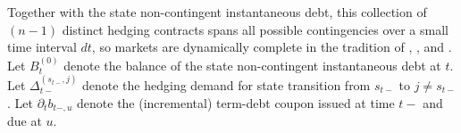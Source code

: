 \documentclass[12pt]{article}
\newcommand{\WJ}[1]{{\textcolor{red}{#1}}}
\begin{document}

Together with the state non-contingent instantaneous  debt, this  collection of  $(n-1)$ distinct hedging contracts  spans all possible contingencies over a small time interval $dt$, so  markets  are  dynamically complete %
 in the tradition of  \cite{BlackScholes1973}, \cite{merton1973theory}, and \cite{HarrisonandKreps1979}.  
%
%
%
%
Let $B^{(0)}_t$  denote the  balance of the state non-contingent   instantaneous debt  at $t$. Let $\Delta_{t-}^ {(s_{t-}, j)}$ denote the hedging demand for state transition from $s_{t-}$ to $j\neq s_{t-}$. Let 
$\partial_t b_{t-, u}$  denote  the (incremental) term-debt coupon   issued at time $t-$ and due  at $u$. %
%
%
%
%
%
%
%
%
\end{document}
